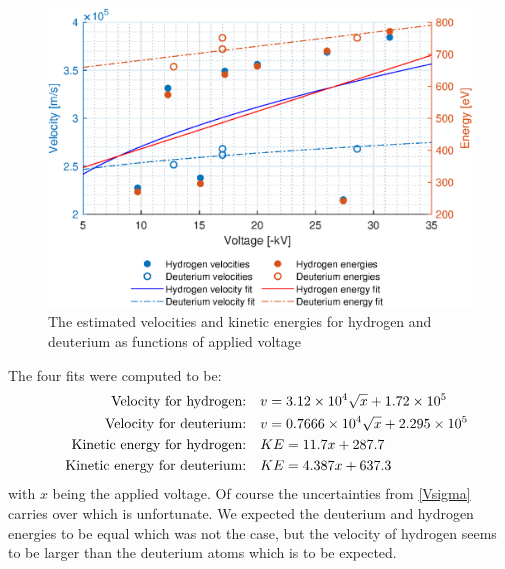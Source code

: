 \begin{figure}[p]
	\centering
	\includegraphics[width=.8\textwidth]{MatlabFigures/Asign3/KineticVelo.eps}
	\caption{The estimated velocities and kinetic energies for hydrogen and deuterium as functions of applied voltage}
	\label{MF}
\end{figure}
\newline The four fits were computed to be:
\begin{align}
	\qq{Velocity for hydrogen:}        & v = 3.12\times10^4 \sqrt{x}+1.72\times10^5   \\
	\qq{Velocity for deuterium:}       & v = 0.7666\times10^4\sqrt{x}+2.295\times10^5 \\
	\qq{Kinetic energy for hydrogen:}  & KE = 11.7x+287.7                             \\
	\qq{Kinetic energy for deuterium:} & KE = 4.387x+637.3
\end{align}
with \(x\) being the applied voltage. Of course the uncertainties from \cref{Vsigma} carries over which is unfortunate. We expected the deuterium and hydrogen energies to be equal which was not the case, but the velocity of hydrogen seems to be larger than the deuterium atoms which is to be expected.

